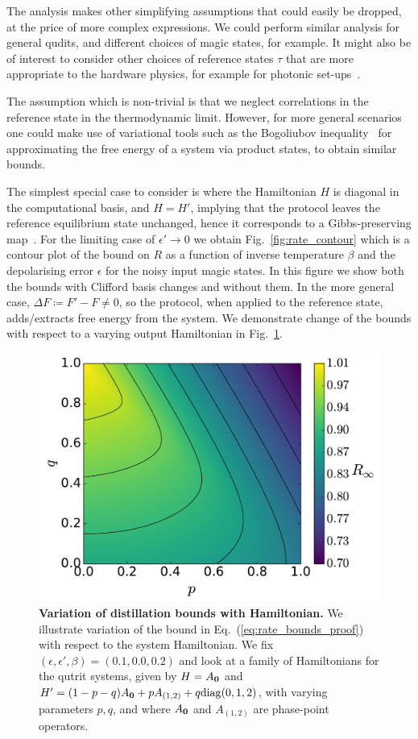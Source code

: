 \documentclass[pra,
aps,
twocolumn,
superscriptaddress,
groupedaddress,
nofootinbib,
reprint
]{revtex4-1}
\begin{document}
The analysis makes other simplifying assumptions that could easily be dropped, at the price of more complex expressions. We could perform similar analysis for general qudits, and different choices of magic states, for example. It might also be of interest to consider other choices of reference states $\tau$ that are more appropriate to the hardware physics, for example for photonic set-ups~\cite{bombin2021interleaving}.

The assumption which is non-trivial is that we neglect correlations in the reference state in the thermodynamic limit. However, for more general scenarios one could make use of variational tools such as the Bogoliubov inequality~\cite{bogolyubov_1966} for approximating the free energy of a system via product states, to obtain similar bounds.

The simplest special case to consider is where the Hamiltonian $H$ is diagonal in the computational basis, and $H=H'$, implying that the protocol leaves the reference equilibrium state unchanged, hence it corresponds to a Gibbs-preserving map~\cite{faist_2015}. For the limiting case of $\epsilon' \rightarrow 0$ we obtain Fig.~\ref{fig:rate_contour} which is a contour plot of the bound on $R$ as a function of inverse temperature $\beta$ and the depolarising error $\epsilon$ for the noisy input magic states. In this figure we show both the bounds with Clifford basis changes and without them. In the more general case, $\Delta F \coloneqq F' - F \ne 0$, so the protocol, when applied to the reference state, adds/extracts free energy from the system.
We demonstrate change of the bounds with respect to a varying output Hamiltonian in Fig.~\ref{fig:rvsa}.

\begin{figure}
    \centering
    \includegraphics[scale=0.35]{figs/R_vs_A.pdf}
    \caption{\textbf{Variation of distillation bounds with Hamiltonian.}  We illustrate variation of the bound in Eq.~(\ref{eq:rate_bounds_proof}) with respect to the system Hamiltonian. We fix $(\epsilon, \epsilon', \beta) = (0.1, 0.0, 0.2)$ and look at a family of Hamiltonians for the qutrit systems, given by $H = A_{\bm{0}}$ and $H' = (1-p-q)A_{\bm{0}}+pA_{(1,2)}+q{\rm{diag}}(0,1,2)$, with varying parameters $p, q$, and where $A_{\bm{0}}$ and $A_{(1,2)}$ are phase-point operators. 
    }
    \label{fig:rvsa}
\end{figure}
\end{document}
